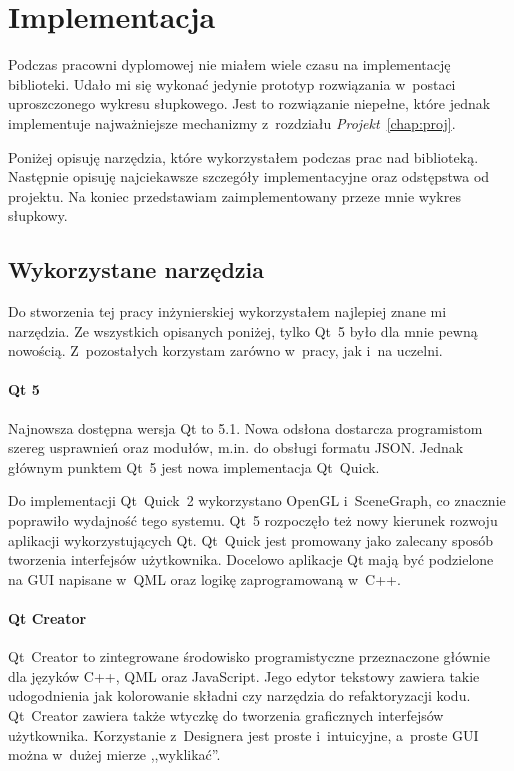 \chapter{Implementacja}
Podczas pracowni dyplomowej nie miałem wiele czasu na implementację biblioteki. Udało mi się wykonać jedynie prototyp rozwiązania w~postaci uproszczonego wykresu słupkowego. Jest to rozwiązanie niepełne, które jednak implementuje najważniejsze mechanizmy z~rozdziału \textit{Projekt}~\ref{chap:proj}. 

Poniżej opisuję narzędzia, które wykorzystałem podczas prac nad biblioteką. Następnie opisuję najciekawsze szczegóły implementacyjne oraz odstępstwa od projektu. Na koniec przedstawiam zaimplementowany przeze mnie wykres słupkowy.

\section{Wykorzystane narzędzia}
Do stworzenia tej pracy inżynierskiej wykorzystałem najlepiej znane mi narzędzia. Ze wszystkich opisanych poniżej, tylko Qt~5 było dla mnie pewną nowością. Z~pozostałych korzystam zarówno w~pracy, jak i~na uczelni.
 
\subsubsection{Qt 5}
Najnowsza dostępna wersja Qt to 5.1. Nowa odsłona dostarcza programistom szereg usprawnień oraz modułów, m.in. do obsługi formatu JSON. Jednak głównym punktem Qt~5 jest nowa implementacja Qt~Quick. 

Do implementacji Qt~Quick~2 wykorzystano OpenGL i~SceneGraph, co znacznie poprawiło wydajność tego systemu. Qt~5 rozpoczęło też nowy kierunek rozwoju aplikacji wykorzystujących Qt. Qt~Quick jest promowany jako zalecany sposób tworzenia interfejsów użytkownika. Docelowo aplikacje Qt mają być podzielone na GUI napisane w~QML oraz logikę zaprogramowaną w~C++.

\subsubsection{Qt Creator}
Qt~Creator to zintegrowane środowisko programistyczne przeznaczone głównie dla języków C++, QML oraz JavaScript. Jego edytor tekstowy zawiera takie udogodnienia jak kolorowanie składni czy narzędzia do refaktoryzacji kodu. Qt~Creator zawiera także wtyczkę do tworzenia graficznych interfejsów użytkownika. Korzystanie z~Designera jest proste i~intuicyjne, a~proste GUI można w~dużej mierze ,,wyklikać''.

